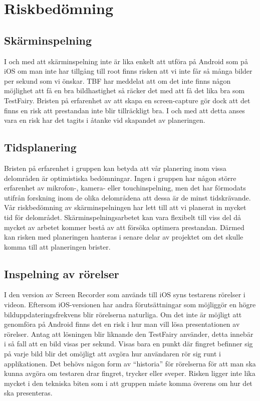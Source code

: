 \section{Riskbedömning}

\subsection{Skärminspelning}
I och med att skärminspelning inte är lika enkelt att utföra på Android som på iOS om man inte har tillgång till root finns risken att vi inte får så många bilder per sekund som vi önskar. TBF har meddelat att om det inte finns någon möjlighet att få en bra bildhastighet så räcker det med att få det lika bra som TestFairy. Bristen på erfarenhet av att skapa en screen-capture gör dock att det finns en risk att prestandan inte blir tillräckligt bra. I och med att detta anses vara en risk har det tagits i åtanke vid skapandet av planeringen.

\subsection{Tidsplanering}
Bristen på erfarenhet i gruppen kan betyda att vår planering inom vissa delområden är optimistiska bedömningar. Ingen i gruppen har någon större erfarenhet av mikrofon-, kamera- eller touchinspelning, men det har förmodats utifrån forskning inom de olika delområdena att dessa är de minst tidskrävande. Vår riskbedömning av skärminspelningen har lett till att vi planerat in mycket tid för delområdet. Skärminspelningsarbetet kan vara flexibelt till viss del då mycket av arbetet kommer bestå av att försöka optimera prestandan. Därmed kan risken med planeringen hanteras i senare delar av projektet om det skulle komma till att planeringen brister.

\subsection{Inspelning av rörelser}
I den version av Screen Recorder som används till iOS syns testarens rörelser i videon. Eftersom iOS-versionen har andra förutsättningar som möjliggör en högre bilduppdateringsfrekvens blir rörelserna naturliga. Om det inte är möjligt att genomföra på Android finns det en risk i hur man vill lösa presentationen av rörelser. Antag att lösningen blir liknande den TestFairy använder, detta innebär i så fall att en bild visas per sekund. Visas bara en punkt där fingret befinner sig på varje bild blir det omöjligt att avgöra hur användaren rör sig runt i applikationen. Det behövs någon form av ``historia'' för rörelserna för att man ska kunna avgöra om testaren drar fingret, trycker eller sveper. Risken ligger inte lika mycket i den tekniska biten som i att gruppen måste komma överens om hur det ska presenteras.

